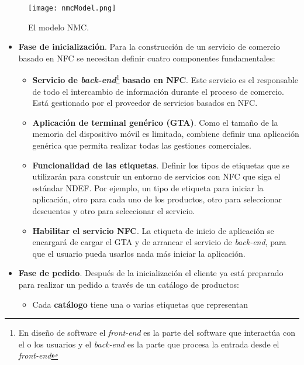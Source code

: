   \begin{figure}[!h]
    \begin{center}
      \texttt{[image: nmcModel.png]}
      \caption{El modelo \acs{NMC}.}
      \label{fig:nmcModel}
    \end{center}
  \end{figure}

  \begin{itemize}
  \item \textbf{Fase de inicialización}. Para la construcción de un servicio
  de comercio basado en \acs{NFC} se necesitan definir cuatro componentes
  fundamentales:
    \begin{itemize}
    \item \textbf{Servicio de \emph{back-end}}\footnote{En diseño de software
    el \emph{front-end} es la parte del software que interactúa con el o los
    usuarios y el \emph{back-end} es la parte que procesa la entrada desde el
    \emph{front-end}} \textbf{basado en \acs{NFC}}. Este
    servicio es el responsable de todo el intercambio de información durante
    el proceso de comercio. Está gestionado por el proveedor de servicios
    basados en \acs{NFC}.
    \item \textbf{Aplicación de terminal genérico (\acs{GTA})}. Como el tamaño
    de la memoria del dispositivo móvil es limitada, combiene definir una
    aplicación genérica que permita realizar todas las gestiones comerciales.
    \item \textbf{Funcionalidad de las etiquetas}. Definir los tipos de
    etiquetas que se utilizarán para construir un entorno de servicios con
    \acs{NFC} que siga el estándar \acs{NDEF}. Por ejemplo, un tipo de etiqueta
    para iniciar la aplicación, otro para cada uno de los productos, otro
    para seleccionar descuentos y otro para seleccionar el servicio.
    \item \textbf{Habilitar el servicio \acs{NFC}}. La etiqueta de inicio de
    aplicación se encargará de cargar el \acs{GTA} y de arrancar el servicio de
    \emph{back-end}, para que el usuario pueda usarlos nada más iniciar la
    aplicación.
    \end{itemize}
  \item \textbf{Fase de pedido}. Después de la inicialización el cliente ya
  está preparado para realizar un pedido a través de un catálogo de productos:
    \begin{itemize}
    \item Cada \textbf{catálogo} tiene una o varias etiquetas que representan

\end{itemize}
\end{itemize}
